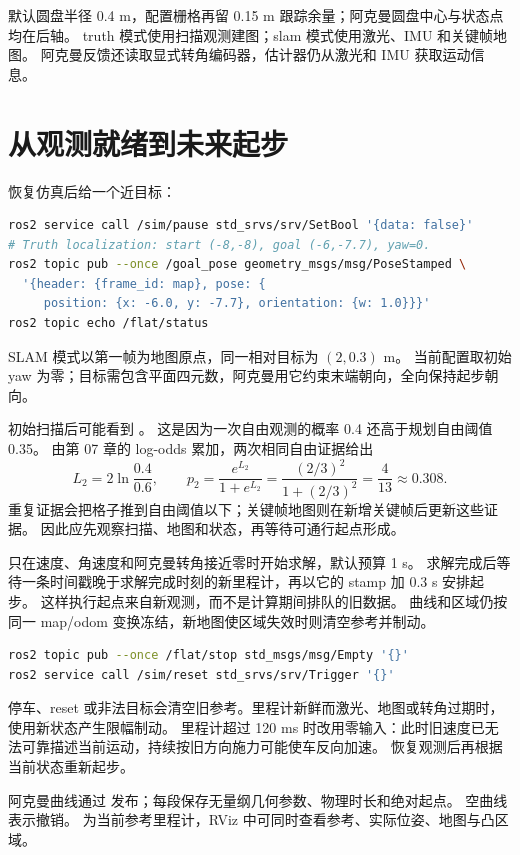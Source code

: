 默认圆盘半径 0.4 m，配置栅格再留 0.15 m 跟踪余量；阿克曼圆盘中心与状态点均在后轴。
truth 模式使用扫描观测建图；slam 模式使用激光、IMU 和关键帧地图。
阿克曼反馈还读取显式转角编码器，估计器仍从激光和 IMU 获取运动信息。

\section{从观测就绪到未来起步}
恢复仿真后给一个近目标：
\begin{lstlisting}[language=bash,numbers=none]
ros2 service call /sim/pause std_srvs/srv/SetBool '{data: false}'
# Truth localization: start (-8,-8), goal (-6,-7.7), yaw=0.
ros2 topic pub --once /goal_pose geometry_msgs/msg/PoseStamped \
  '{header: {frame_id: map}, pose: {
     position: {x: -6.0, y: -7.7}, orientation: {w: 1.0}}}'
ros2 topic echo /flat/status
\end{lstlisting}
SLAM 模式以第一帧为地图原点，同一相对目标为 $(2,0.3)$ m。
当前配置取初始 yaw 为零；目标需包含平面四元数，阿克曼用它约束末端朝向，全向保持起步朝向。

初始扫描后可能看到 。
这是因为一次自由观测的概率 0.4 还高于规划自由阈值 0.35。
由第 07 章的 log-odds 累加，两次相同自由证据给出
\[
 L_2=2\ln\frac{0.4}{0.6},\qquad
 p_2=\frac{e^{L_2}}{1+e^{L_2}}=\frac{(2/3)^2}{1+(2/3)^2}=\frac4{13}\approx0.308.
\]
重复证据会把格子推到自由阈值以下；关键帧地图则在新增关键帧后更新这些证据。
因此应先观察扫描、地图和状态，再等待可通行起点形成。

只在速度、角速度和阿克曼转角接近零时开始求解，默认预算 1 s。
求解完成后等待一条时间戳晚于求解完成时刻的新里程计，再以它的 stamp 加 0.3 s 安排起步。
这样执行起点来自新观测，而不是计算期间排队的旧数据。
曲线和区域仍按同一 map/odom 变换冻结，新地图使区域失效时则清空参考并制动。

\begin{lstlisting}[language=bash,numbers=none]
ros2 topic pub --once /flat/stop std_msgs/msg/Empty '{}'
ros2 service call /sim/reset std_srvs/srv/Trigger '{}'
\end{lstlisting}
停车、reset 或非法目标会清空旧参考。里程计新鲜而激光、地图或转角过期时，使用新状态产生限幅制动。
里程计超过 120 ms 时改用零输入：此时旧速度已无法可靠描述当前运动，持续按旧方向施力可能使车反向加速。
恢复观测后再根据当前状态重新起步。

阿克曼曲线通过  发布；每段保存无量纲几何参数、物理时长和绝对起点。
空曲线表示撤销。\code{/flat/reference} 为当前参考里程计，RViz 中可同时查看参考、实际位姿、地图与凸区域。

